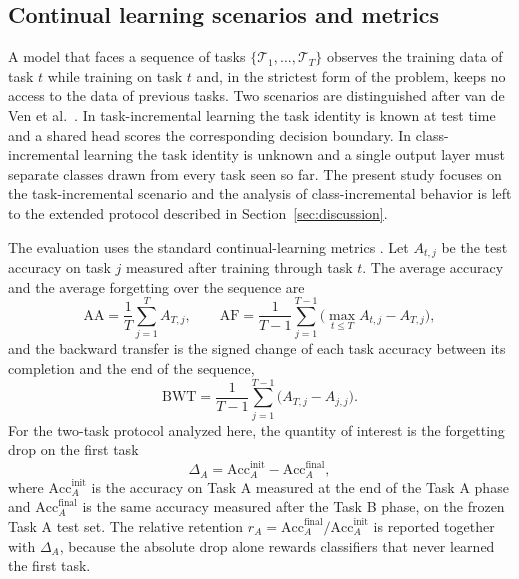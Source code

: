 \documentclass[preprint,number,sort&compress]{elsarticle}
\begin{document}
\subsection{Continual learning scenarios and metrics}

A model that faces a sequence of tasks $\{\mathcal{T}_1, \dots, \mathcal{T}_T\}$
observes the training data of task $t$ while training on task $t$ and, in the
strictest form of the problem, keeps no access to the data of previous
tasks. Two scenarios are distinguished after van de Ven et
al.~\cite{Ven22}. In task-incremental learning the task identity is known at
test time and a shared head scores the corresponding decision boundary.
In class-incremental learning the task identity is unknown and a single
output layer must separate classes drawn from every task seen so far. The
present study focuses on the task-incremental scenario and the analysis of
class-incremental behavior is left to the extended protocol described in
Section~\ref{sec:discussion}.

The evaluation uses the standard continual-learning metrics
\cite{lopezpaz2017gem, Lange22}. Let $A_{t,j}$ be the test accuracy on task
$j$ measured after training through task $t$. The average accuracy and the
average forgetting over the sequence are
\begin{equation}
  \mathrm{AA} = \frac{1}{T}\sum_{j=1}^{T} A_{T,j}, \qquad
  \mathrm{AF} = \frac{1}{T-1}\sum_{j=1}^{T-1} \bigl(\max_{t \leq T} A_{t,j} - A_{T,j}\bigr),
  \label{eq:aa_af}
\end{equation}
and the backward transfer is the signed change of each task accuracy between
its completion and the end of the sequence,
\begin{equation}
  \mathrm{BWT} = \frac{1}{T-1}\sum_{j=1}^{T-1} \bigl(A_{T,j} - A_{j,j}\bigr).
  \label{eq:bwt}
\end{equation}
For the two-task protocol analyzed here, the quantity of interest is the
forgetting drop on the first task
\begin{equation}
  \Delta_A = \mathrm{Acc}_A^{\text{init}} - \mathrm{Acc}_A^{\text{final}},
  \label{eq:delta}
\end{equation}
where $\mathrm{Acc}_A^{\text{init}}$ is the accuracy on Task A measured at
the end of the Task A phase and $\mathrm{Acc}_A^{\text{final}}$ is the same
accuracy measured after the Task B phase, on the frozen Task A test set. The
relative retention $r_A = \mathrm{Acc}_A^{\text{final}} /
\mathrm{Acc}_A^{\text{init}}$ is reported together with $\Delta_A$, because the
absolute drop alone rewards classifiers that never learned the first task.
\end{document}

